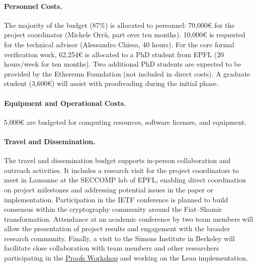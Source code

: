 \documentclass{article}
\begin{document}
\paragraph{Personnel Costs.} The majority of the budget (87\%) is allocated to personnel: 70,000\euro{} for the project coordinator (Michele Orrù, part over ten months). 10,000\euro{} is requested for the technical advisor (Alessandro Chiesa, 40 hours). For the core formal verification work, 62,254\euro{} is allocated to a PhD student from EPFL (20 hours/week for ten months). Two additional PhD students are expected to be provided by the Ethereum Foundation (not included in direct costs). A graduate student (3,600\euro{}) will assist with proofreading during the initial phase.

\paragraph{Equipment and Operational Costs.}
5,000\euro{} are budgeted for computing resources, software licenses, and equipment.

\paragraph{Travel and Dissemination.} The travel and dissemination budget supports in-person collaboration and outreach activities. It includes a research visit for the project coordinators to meet in Lausanne at the SECCOMP lab of EPFL, enabling direct coordination on project milestones and addressing potential issues in the paper or implementation. Participation in the IETF conference is planned to build consensus within the cryptography community around the Fiat--Shamir transformation. Attendance at an academic conference by two team members will allow the presentation of project results and engagement with the broader research community. Finally, a visit to the Simons Institute in Berkeley will facilitate close collaboration with team members and other researchers participating in the \href{https://simons.berkeley.edu/workshops/cryptography-10-years-later-obfuscation-proof-systems-secure-computation-boot-campx}{Proofs Workshop} and working on the Lean implementation.
\end{document}
